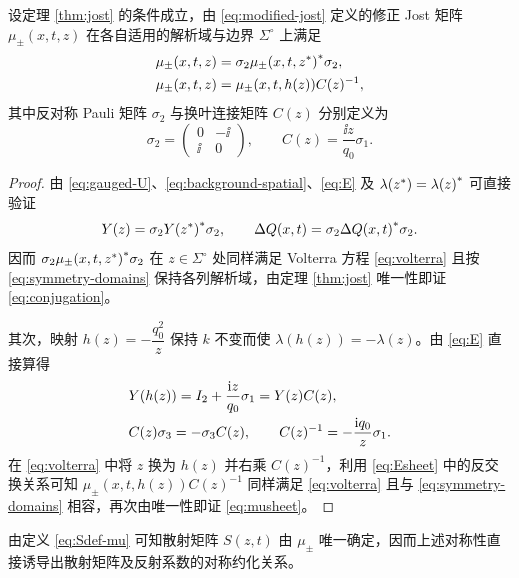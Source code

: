 \begin{proposition}\label{prop:symmetry}
设定理 \ref{thm:jost} 的条件成立，由 \eqref{eq:modified-jost} 定义的修正 Jost 矩阵 $\mu_\pm(x,t,z)$ 在各自适用的解析域与边界 $\Sigma^\circ$ 上满足
\begin{align}
&\mu_\pm(x,t,z)=\sigma_2{\mu_\pm(x,t,{z}^{*})}^{*}\sigma_2,\label{eq:conjugation}\\
&\mu_\pm(x,t,z)=\mu_\pm(x,t,h(z))C(z)^{-1},\label{eq:musheet}
\end{align}
其中反对称 Pauli 矩阵 $\sigma_2$ 与换叶连接矩阵 $C(z)$ 分别定义为
\begin{equation*}
\sigma_2=\begin{pmatrix}0&-\ii\\\ii&0\end{pmatrix},\qquad
C(z)=\dfrac{\ii z}{q_0}\sigma_1.
\end{equation*}
\end{proposition}
\begin{proof}
由 \eqref{eq:gauged-U}、\eqref{eq:background-spatial}、\eqref{eq:E} 及 $\lambda({z}^{*})={\lambda(z)}^{*}$ 可直接验证
\begin{equation*}
Y(z)=\sigma_2{Y({z}^{*})}^{*}\sigma_2,\qquad
\Delta Q(x,t)=\sigma_2{\Delta Q(x,t)}^{*}\sigma_2.
\end{equation*}
因而 $\sigma_2{\mu_\pm(x,t,{z}^{*})}^{*}\sigma_2$ 在 $z\in\Sigma^\circ$ 处同样满足 Volterra 方程 \eqref{eq:volterra} 且按 \eqref{eq:symmetry-domains} 保持各列解析域，由定理 \ref{thm:jost} 唯一性即证 \eqref{eq:conjugation}。

其次，映射 $h(z)=-\dfrac{q_0^2}{z}$ 保持 $k$ 不变而使 $\lambda(h(z))=-\lambda(z)$。由 \eqref{eq:E} 直接算得
\begin{equation}\label{eq:Esheet}
\begin{aligned}
&Y(h(z))=I_2+\dfrac{\mathrm{i} z}{q_0}\sigma_1=Y(z)C(z),\\
&C(z)\sigma_3=-\sigma_3 C(z),\qquad
C(z)^{-1}=-\dfrac{\mathrm{i} q_0}{z}\sigma_1.
\end{aligned}
\end{equation}
在 \eqref{eq:volterra} 中将 $z$ 换为 $h(z)$ 并右乘 $C(z)^{-1}$，利用 \eqref{eq:Esheet} 中的反交换关系可知 $\mu_\pm(x,t,h(z))C(z)^{-1}$ 同样满足 \eqref{eq:volterra} 且与 \eqref{eq:symmetry-domains} 相容，再次由唯一性即证 \eqref{eq:musheet}。
\end{proof}

由定义 \eqref{eq:Sdef-mu} 可知散射矩阵 $S(z,t)$ 由 $\mu_\pm$ 唯一确定，因而上述对称性直接诱导出散射矩阵及反射系数的对称约化关系。

